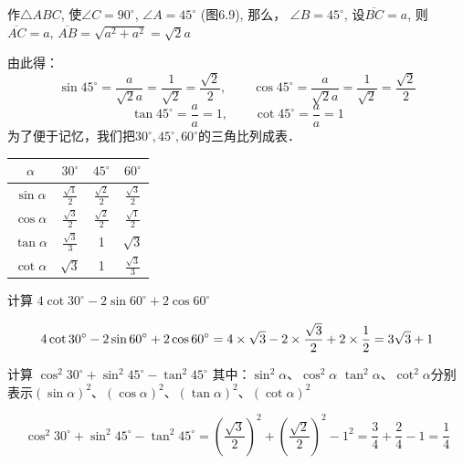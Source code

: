 作$\triangle ABC$, 使$\angle C=90^{\circ}$, $\angle A=45^{\circ}$ (图6.9), 那么，
$\angle B=45^{\circ}$, 设$\overline{BC}=a$, 则$\overline{AC}=a$, $\overline{AB}=\sqrt{a^2+a^2}=\sqrt{2}a$

由此得：
\[\sin 45^{\circ}=\frac{a}{\sqrt{2}a}=\frac{1}{\sqrt{2}}=\frac{\sqrt{2}}{2},\qquad \cos 45^{\circ}=\frac{a}{\sqrt{2}a}=\frac{1}{\sqrt{2}}=\frac{\sqrt{2}}{2}\]
\[\tan 45^{\circ}=\frac{a}{a}=1,\qquad \cot 45^{\circ}=\frac{a}{a}=1\]
为了便于记忆，我们把$30^{\circ},45^{\circ},60^{\circ}$的三角比列成表．
\begin{center}
    \begin{tabular}{c|ccc}
        \hline
$\alpha$&$30^{\circ}$&$45^{\circ}$&$60^{\circ}$\\
\hline
$\sin\alpha$  &  $\frac{\sqrt{1}}{2}$ & $\frac{\sqrt{2}}{2}$& $\frac{\sqrt{3}}{2}$\\
$\cos\alpha$  &  $\frac{\sqrt{3}}{2}$ & $\frac{\sqrt{2}}{2}$& $\frac{\sqrt{1}}{2}$\\
$\tan\alpha$  &  $\frac{\sqrt{3}}{3}$ &1&$\sqrt{3}$\\
$\cot\alpha$  &  $\sqrt{3}$ &1&$\frac{\sqrt{3}}{3}$\\
\hline
    \end{tabular}
\end{center}

\begin{example}
    计算 $4\cot 30^{\circ}-2\sin60^{\circ}+2\cos60^{\circ}$
\end{example}

\begin{solution}
\[4\cot 30^{\circ}-2\sin60^{\circ}+2\cos60^{\circ} =4\times \sqrt{3}-2\times \dfrac{\sqrt{3}}{2}+2\times \dfrac{1}{2}=3\sqrt{3}+1
\]
\end{solution}


\begin{example}
    计算
$\cos^2 30^{\circ}+\sin^2 45^{\circ}-\tan^2 45^{\circ}$
其中：$\sin^2\alpha$、$\cos^2\alpha$
$\tan^2\alpha$、$\cot^2\alpha$分别表示$(\sin\alpha)^2$、$(\cos \alpha)^2$、$(\tan\alpha)^2$、$(\cot \alpha)^2$
\end{example}


\begin{solution}
\[\cos^2 30^{\circ}+\sin^2 45^{\circ}-\tan^2 45^{\circ}=\left(\frac{\sqrt{3}}{2}\right)^2+\left(\frac{\sqrt{2}}{2}\right)^2-1^2=\frac{3}{4}+\frac{2}{4}-1=\frac{1}{4}\]
\end{solution}

